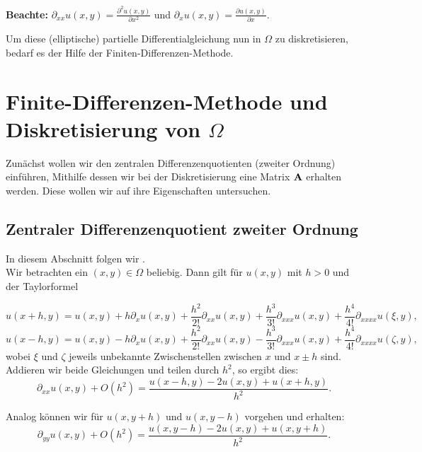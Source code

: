 \textbf{Beachte:} $\partial_{xx}u(x,y) = \frac {\partial^{2}u(x,y)} {\partial x^{2}}$ und $\partial_{x}u(x,y) = \frac {\partial u(x,y)} {\partial x}$.

Um diese (elliptische) partielle Differentialgleichung nun in $\Omega$ zu diskretisieren, bedarf es der Hilfe der Finiten-Differenzen-Methode.

\section{Finite-Differenzen-Methode und Diskretisierung von $\Omega$}\label{s.Finite Differenzen}

Zunächst wollen wir den zentralen Differenzenquotienten (zweiter Ordnung) einführen, Mithilfe dessen wir bei der Diskretisierung eine Matrix ${\textbf{A}}$ erhalten werden. Diese wollen wir auf ihre Eigenschaften untersuchen.

\subsection{Zentraler Differenzenquotient zweiter Ordnung}\label{ss.Differenzenquotient zweiter Ordnung}

In diesem Abschnitt folgen wir \cite{ALO1}.\\
Wir betrachten ein $(x,y) \in \Omega$ beliebig. Dann gilt für $u(x,y)$ mit $h > 0$ und der Taylorformel

\begin{equation}
u(x+h,y) = u(x,y) + h \partial_{x} u(x,y) + \frac {h^{2}} {2!} \partial_{xx} u(x,y) + \frac{h^{3}}{3!} \partial_{xxx} u(x,y) + \frac{h^{4}}{4!} \partial_{xxxx} u(\xi,y),\label{eq.Partiall x+h}
\end{equation}
\begin{equation}
u(x-h,y) = u(x,y) - h \partial_{x} u(x,y) + \frac {h^{2}} {2!} \partial_{xx} u(x,y) - \frac{h^{3}}{3!} \partial_{xxx} u(x,y) + \frac{h^{4}}{4!} \partial_{xxxx} u(\zeta,y),\label{eq.Partiall x-h}
\end{equation}
wobei $\xi$ und $\zeta$ jeweils unbekannte Zwischenstellen zwischen $x$ und $x \pm h$ sind. Addieren wir beide Gleichungen und teilen durch $h^{2}$, so ergibt dies:
\begin{equation}
\partial_{xx} u(x,y) + O(h^{2}) = \frac {u(x-h,y) - 2u(x,y) + u(x+h,y)} {h^{2}}.
\end{equation}

Analog können wir für $u(x,y+h)$ und $u(x,y-h)$ vorgehen und erhalten:
\begin{equation}
\partial_{yy} u(x,y) + O(h^{2}) = \frac {u(x,y-h) - 2u(x,y) + u(x,y+h)} {h^{2}}.
\end{equation}

